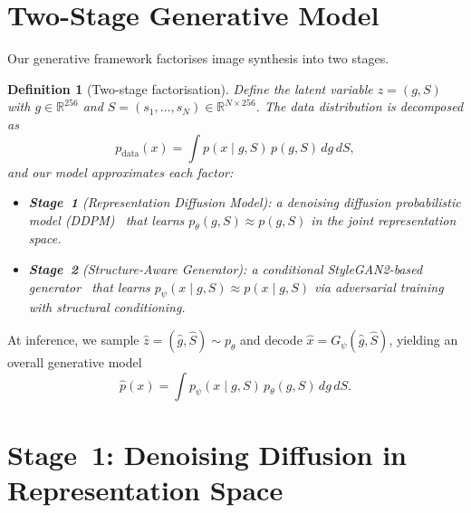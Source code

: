 \documentclass[12pt]{article}
\newtheorem{definition}[theorem]{Definition}
\begin{document}
\section{Two-Stage Generative Model}
\label{sec:two-stage}

Our generative framework factorises image synthesis into two stages.

\begin{definition}[Two-stage factorisation]
\label{def:two-stage}
Define the latent variable $z = (g, S)$ with $g \in \mathbb{R}^{256}$ and
$S = (s_1, \ldots, s_N) \in \mathbb{R}^{N \times 256}$.
The data distribution is decomposed as
\begin{equation}\label{eq:marginalisation}
    p_{\mathrm{data}}(x)
    = \int p(x \mid g, S)\, p(g, S)\, dg\, dS,
\end{equation}
and our model approximates each factor:
\begin{itemize}
    \item \textbf{Stage~1} (Representation Diffusion Model):
    a denoising diffusion probabilistic model (DDPM)~\cite{ho2020ddpm}
    that learns $p_\theta(g, S) \approx p(g, S)$
    in the joint representation space.
    \item \textbf{Stage~2} (Structure-Aware Generator):
    a conditional StyleGAN2-based generator~\cite{karras2020stylegan2}
    that learns $p_\psi(x \mid g, S) \approx p(x \mid g, S)$
    via adversarial training with structural conditioning.
\end{itemize}
\end{definition}

At inference, we sample
$\hat{z} = (\hat{g}, \hat{S}) \sim p_\theta$
and decode
$\hat{x} = G_\psi(\hat{g}, \hat{S})$,
yielding an overall generative model
\begin{equation}\label{eq:generative-model}
    \hat{p}(x) = \int p_\psi(x \mid g, S)\, p_\theta(g, S)\, dg\, dS.
\end{equation}

\section{Stage~1: Denoising Diffusion in Representation Space}
\label{sec:stage1}
\end{document}
